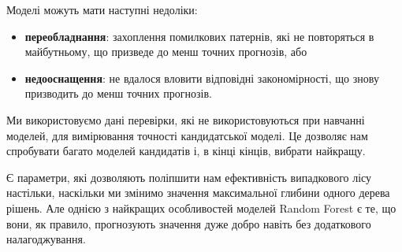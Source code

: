 \Conclusion %

Моделі можуть мати наступні недоліки:

\begin{itemize}
    \item \textbf{переобладнання}: захоплення помилкових патернів, які не повторяться в майбутньому, що призведе до менш точних прогнозів, або
    \item \textbf{недооснащення}: не вдалося вловити відповідні закономірності, що знову призводить до менш точних прогнозів.
\end{itemize}
Ми використовуємо дані перевірки, які не використовуються при навчанні моделей, для вимірювання точності кандидатської моделі.
Це дозволяє нам спробувати багато моделей кандидатів і, в кінці кінців, вибрати найкращу.

Є параметри, які дозволяють поліпшити нам ефективність випадкового лісу настільки, наскільки ми змінимо значення максимальної глибини одного дерева рішень.
Але однією з найкращих особливостей моделей Random Forest є те, що вони, як правило, прогнозують значення дуже добро навіть без додаткового налагоджування.
